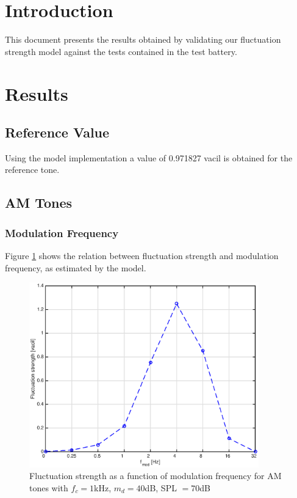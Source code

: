 \documentclass[a4paper]{article}
\begin{document}

\section{Introduction}

This document presents the results obtained by validating our fluctuation
strength model against the tests contained in the test battery.

\section{Results}

\subsection{Reference Value}

Using the model implementation a value of 0.971827 vacil is obtained for the
reference tone.

\subsection{AM Tones}

\subsubsection{Modulation Frequency}

Figure \ref{fig:AMtonesfmplot} shows the relation between fluctuation strength
and modulation frequency, as estimated by the model.

\begin{figure}[ht]
    \centering
    \includegraphics[height=8cm]{img/am_tones_fm_plot}
    \caption{Fluctuation strength as a function of modulation frequency for AM
        tones with $f_c = 1 $kHz, $m_d = 40 $dB, SPL $= 70 $dB}
    \label{fig:AMtonesfmplot}
\end{figure}
\end{document}
